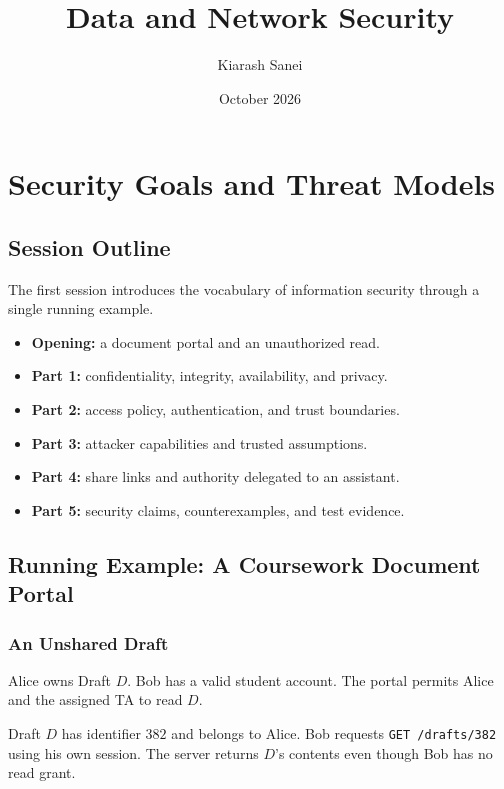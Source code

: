 \documentclass[hidelinks]{article}
\title{\color{carminered}\textbf{Data and Network Security}}
\author{\color{Thistle}Kiarash Sanei}
\date{\color{SkyBlue}October 2026}
\begin{document}
\maketitle
\begin{Large}
\tableofcontents
\end{Large}
\newpage

\section{Security Goals and Threat Models}

\subsection{Session Outline}

The first session introduces the vocabulary of information security through a single running example.
\begin{itemize}
    \item \textbf{Opening:} a document portal and an unauthorized read.
    \item \textbf{Part 1:} confidentiality, integrity, availability, and privacy.
    \item \textbf{Part 2:} access policy, authentication, and trust boundaries.
    \item \textbf{Part 3:} attacker capabilities and trusted assumptions.
    \item \textbf{Part 4:} share links and authority delegated to an assistant.
    \item \textbf{Part 5:} security claims, counterexamples, and test evidence.
\end{itemize}

\subsection{Running Example: A Coursework Document Portal}

\subsubsection{An Unshared Draft}

Alice owns Draft $D$. Bob has a valid student account. The portal permits Alice and the assigned TA to read $D$.

Draft $D$ has identifier $382$ and belongs to Alice. Bob requests \texttt{GET /drafts/382} using his own session. The server returns $D$'s contents even though Bob has no read grant.
\end{document}
